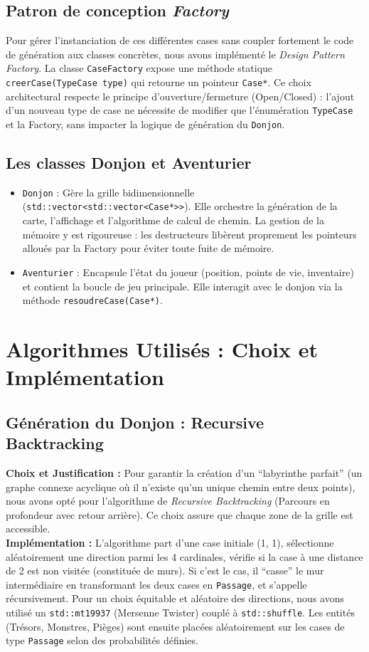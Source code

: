 \documentclass[11pt,a4paper]{article}
\begin{document}
\subsection{Patron de conception \textit{Factory}}
Pour gérer l'instanciation de ces différentes cases sans coupler fortement le code de génération aux classes concrètes, nous avons implémenté le \textit{Design Pattern Factory}. La classe \texttt{CaseFactory} expose une méthode statique \texttt{creerCase(TypeCase type)} qui retourne un pointeur \texttt{Case*}. Ce choix architectural respecte le principe d'ouverture/fermeture (Open/Closed) : l'ajout d'un nouveau type de case ne nécessite de modifier que l'énumération \texttt{TypeCase} et la Factory, sans impacter la logique de génération du \texttt{Donjon}.

\subsection{Les classes Donjon et Aventurier}
\begin{itemize}
    \item \texttt{Donjon} : Gère la grille bidimensionnelle (\texttt{std::vector<std::vector<Case*>>}). Elle orchestre la génération de la carte, l'affichage et l'algorithme de calcul de chemin. La gestion de la mémoire y est rigoureuse : les destructeurs libèrent proprement les pointeurs alloués par la Factory pour éviter toute fuite de mémoire.
    \item \texttt{Aventurier} : Encapsule l'état du joueur (position, points de vie, inventaire) et contient la boucle de jeu principale. Elle interagit avec le donjon via la méthode \texttt{resoudreCase(Case*)}.
\end{itemize}

\section{Algorithmes Utilisés : Choix et Implémentation}
\subsection{Génération du Donjon : Recursive Backtracking}
\textbf{Choix et Justification :} Pour garantir la création d'un ``labyrinthe parfait'' (un graphe connexe acyclique où il n'existe qu'un unique chemin entre deux points), nous avons opté pour l'algorithme de \textit{Recursive Backtracking} (Parcours en profondeur avec retour arrière). Ce choix assure que chaque zone de la grille est accessible.
\\
\textbf{Implémentation :} L'algorithme part d'une case initiale (1, 1), sélectionne aléatoirement une direction parmi les 4 cardinales, vérifie si la case à une distance de 2 est non visitée (constituée de murs). Si c'est le cas, il ``casse'' le mur intermédiaire en transformant les deux cases en \texttt{Passage}, et s'appelle récursivement. Pour un choix équitable et aléatoire des directions, nous avons utilisé un \texttt{std::mt19937} (Mersenne Twister) couplé à \texttt{std::shuffle}. Les entités (Trésors, Monstres, Pièges) sont ensuite placées aléatoirement sur les cases de type \texttt{Passage} selon des probabilités définies.
\end{document}
